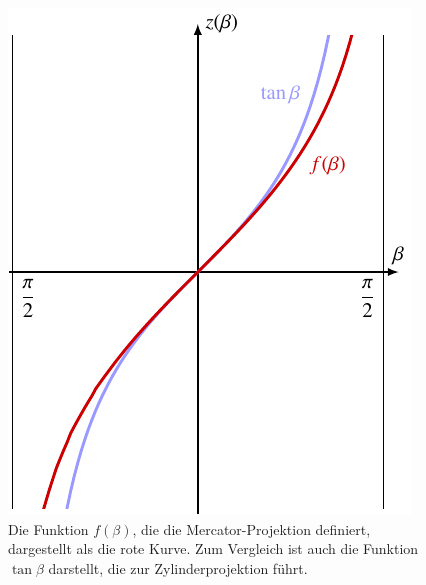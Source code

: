 %
%
%
\begin{figure}
\centering
\includegraphics{chapters/030-kurvenintegral/images/mercator.pdf}
\caption{Die Funktion $f(\beta)$, die die Mercator-Projektion definiert,
dargestellt als die {\color{darkred}rote} Kurve.
Zum Vergleich ist auch die Funktion $\tan\beta$ darstellt, die zur
Zylinderprojektion führt.
\label{buch:kurvenintegral:fig:mercator}}
\end{figure}
